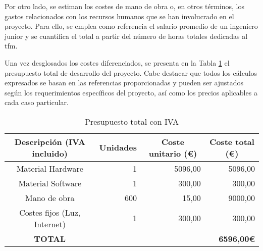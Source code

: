 \vspace{3mm}

Por otro lado, se estiman los costes de mano de obra o, en otros términos, los gastos relacionados con los recursos humanos que se han involucrado en el proyecto. Para ello, se emplea como referencia el salario promedio de un ingeniero junior y se cuantifica el total a partir del número de horas totales dedicadas al \gls{tfm}. 

\vspace{3mm}

Una vez desglosados los costes diferenciados, se presenta en la Tabla \ref{tab:budget} el presupuesto total de desarrollo del proyecto. Cabe destacar que todos los cálculos expresados se basan en las referencias proporcionadas y pueden ser ajustados según los requerimientos específicos del proyecto, así como los precios aplicables a cada caso particular.

\vspace{3mm}

\begin{table}[ht]
	\centering
	\begin{tabular}{|c|r|r|r|}
		\hline
		\rowcolor[HTML]{EFEFEF}
		Descripción (IVA incluido) & \multicolumn{1}{c|}{\cellcolor[HTML]{EFEFEF}Unidades} & \multicolumn{1}{c|}{\cellcolor[HTML]{EFEFEF}Coste unitario (€)} & \multicolumn{1}{c|}{\cellcolor[HTML]{EFEFEF}Coste total (€)} \\ \hline
		Material Hardware & 1 & 5096,00 & 5096,00 \\ \hline
		Material Software & 1 & 300,00 & 300,00 \\ \hline
		Mano de obra & 600 & 15,00 & 9000,00 \\ \hline
		Costes fijos (Luz, Internet) & 1 & 300,00 & 300,00 \\ \hline
		\rowcolor[HTML]{FFFFC7}
		\textbf{TOTAL}  & \multicolumn{3}{r|}{\cellcolor[HTML]{FFFFC7}\textbf{6596,00€}} \\ \hline
	\end{tabular}
	\caption{Presupuesto total con IVA}
	\label{tab:budget}
\end{table}

